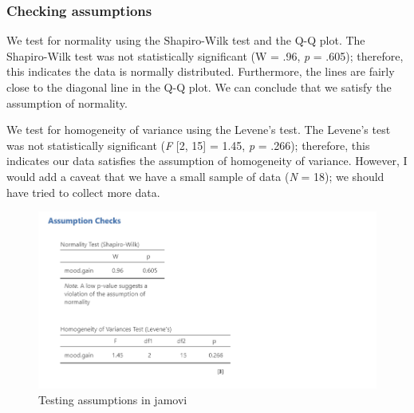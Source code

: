 \documentclass[
]{book}
\begin{document}
\hypertarget{checking-assumptions-4}{%
\subsubsection{Checking assumptions}\label{checking-assumptions-4}}

We test for normality using the Shapiro-Wilk test and the Q-Q plot. The Shapiro-Wilk test was not statistically significant (W = .96, \emph{p} = .605); therefore, this indicates the data is normally distributed. Furthermore, the lines are fairly close to the diagonal line in the Q-Q plot. We can conclude that we satisfy the assumption of normality.

We test for homogeneity of variance using the Levene's test. The Levene's test was not statistically significant (\emph{F} {[}2, 15{]} = 1.45, \emph{p} = .266); therefore, this indicates our data satisfies the assumption of homogeneity of variance. However, I would add a caveat that we have a small sample of data (\emph{N} = 18); we should have tried to collect more data.

\begin{figure}

{\centering \includegraphics[width=1\linewidth]{images/04_one-way-anova/one-way_assumptions1} 

}

\caption{Testing assumptions in jamovi}\label{fig:unnamed-chunk-1}
\end{figure}
\end{document}

